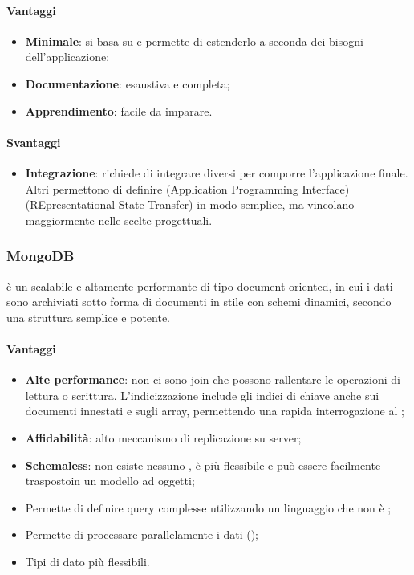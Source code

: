 \paragraph{Vantaggi}
\begin{itemize}
\item \textbf{Minimale}: si basa su  e permette di estenderlo a seconda dei bisogni
dell’applicazione;
\item\textbf{Documentazione}: esaustiva e completa;
\item\textbf{Apprendimento}: facile da imparare.
\end{itemize}

\paragraph{Svantaggi}
\begin{itemize}
\item \textbf{Integrazione}: richiede di integrare  diversi per comporre l’applicazione
finale. Altri  permettono di definire  (Application Programming
Interface)  (REpresentational State Transfer) in modo semplice, ma vincolano
maggiormente nelle scelte progettuali.
\end{itemize}

	\subsubsection{MongoDB}
\textbf{} è un    scalabile e altamente performante di tipo document-oriented, in cui i dati sono archiviati sotto forma di documenti in stile  con schemi dinamici, secondo una struttura semplice e potente. \\

\paragraph{Vantaggi}
 \begin{itemize}

\item \textbf{Alte performance}: non ci sono join che possono rallentare le operazioni di lettura o scrittura. L'indicizzazione include gli indici di chiave anche sui documenti innestati e sugli array, permettendo una rapida interrogazione al ;
\item \textbf{Affidabilità}: alto meccanismo di replicazione su server;
\item \textbf{Schemaless}: non esiste nessuno  , è più flessibile e può essere facilmente traspostoin un modello ad oggetti;
\item Permette di definire query complesse utilizzando un linguaggio che non è ;
\item Permette di processare parallelamente i dati ();
\item Tipi di dato più flessibili.
\end{itemize}  

